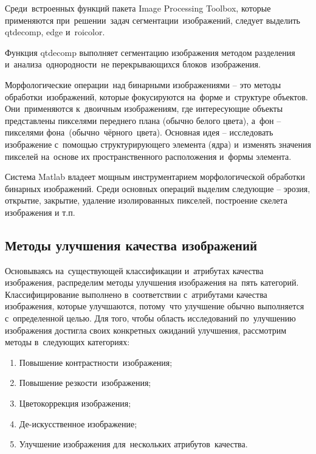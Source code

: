 \documentclass{ou}
\begin{document}
Среди~встроенных функций пакета Image Processing Toolbox, которые применяются при~решении~задач сегментации~изображений, следует выделить qtdecomp, edge и~roicolor.

Функция qtdecomp выполняет сегментацию изображения методом разделения и~анализа~однородности~не перекрывающихся блоков~изображения.

Морфологические операции~над бинарными изображениями -- это методы обработки~изображений, которые фокусируются на~форме и~структуре объектов. Они~применяются к~двоичным изображениям, где интересующие объекты представлены пикселями переднего плана (обычно белого цвета), а~фон -- пикселями фона~(обычно~чёрного~цвета). Основная идея -- исследовать изображение с~помощью структурирующего элемента (ядра) и~изменять значения пикселей на~основе их пространственного расположения и~формы элемента.

Система Matlab владеет мощным инструментарием морфологической обработки бинарных изображений. Среди основных операций выделим следующие -- эрозия, открытие, закрытие, удаление изолированных пикселей, построение скелета изображения и т.п.
\subsection{Методы улучшения качества изображений}
Основываясь на~существующей классификации и~атрибутах качества изображения, распределим методы улучшения изображения на~пять категорий. Классифицирование выполнено в~соответствии с~атрибутами качества изображения, которые улучшаются, потому~что улучшение обычно выполняется с~определенной целью. Для того, чтобы область исследований по~улучшению изображения достигла своих конкретных ожиданий улучшения, рассмотрим методы в~следующих категориях:
\begin{enumerate}[leftmargin=0em, itemindent=3.75em, nosep, label=\arabic*)]
\item Повышение контрастности~изображения;
\item Повышение резкости~изображения;
\item Цветокоррекция изображения;
\item Де-искусственное изображение;
\item Улучшение изображения для~нескольких атрибутов~качества\cite{Modern_Research_and_Innovations}.
\end{enumerate}
\end{document}
